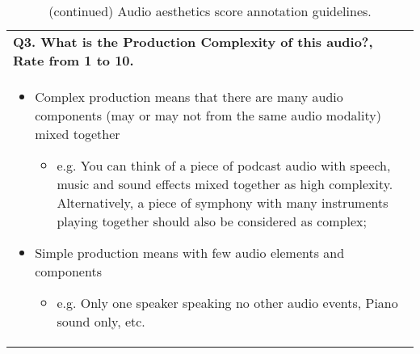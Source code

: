 \begin{table*}[ht]
    \centering
    \caption{(continued) Audio aesthetics score annotation guidelines.}
\begin{tabular}{p{15cm}}
\toprule\toprule

\textbf{Q3. What is the Production Complexity of this audio?, Rate from 1 to 10.} \\
\begin{itemize}[leftmargin=.75cm]
    \item Complex production means that there are many audio components (may or may not from the same audio modality) mixed together
    \begin{itemize}
        \item e.g. You can think of a piece of podcast audio with speech, music and sound effects mixed together as high complexity. Alternatively, a piece of symphony with many instruments playing together should also be considered as complex;
    \end{itemize}
    \item Simple production means with few audio elements and components 
    \begin{itemize}
        \item e.g. Only one speaker speaking no other audio events, Piano sound only, etc.
    \end{itemize}
\end{itemize}\\


\end{tabular}
\end{table*}
